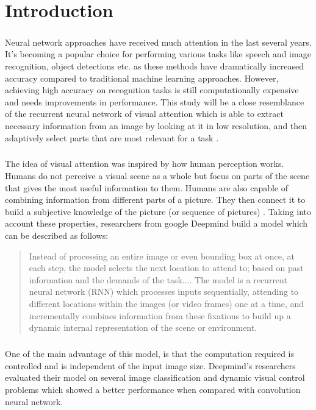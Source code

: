 \chapter{Introduction}
\paragraph{} Neural network approaches have received much attention in the last several years.
It's becoming a popular choice for performing various tasks like speech and image recognition,
object detections etc. as these methods have dramatically increased accuracy
compared to traditional machine learning approaches.
However, achieving high accuracy on recognition tasks is still computationally
expensive and needs improvements in performance.
This study will be a close resemblance of the recurrent neural network of visual attention which is able to extract necessary
information from an image by looking at it in low resolution, and then
adaptively select parts that are most relevant for a task \cite{Mnih2014}.

 \paragraph{} The idea of visual attention was inspired by how human perception works.
 Humans do not perceive a visual scene as a whole but focus on parts of
 the scene that gives the most useful information to them.
 Humans are also capable of combining information from different parts of a picture.
 They then connect it to build a subjective knowledge of the picture (or sequence of pictures) \cite{Goldsborough}.
Taking into account these properties, researchers from google
Deepmind build a model which can be described as follows:
 \blockquote{
 	Instead of processing an entire image or even bounding box at once,
 	at each step, the model selects the next location to attend to;
	based on past information and the demands of the task....
	The model is a recurrent neural network (RNN) which processes
	inputs sequentially, attending to different locations within the
	images (or video frames) one at a time, and incrementally combines
	information from these fixations to build up a dynamic internal
	representation of the scene or environment.\cite{Mnih2014}
}

 \paragraph{} One of the main advantage of this model, is that the computation required is
 controlled and is independent of the input image size.
 Deepmind’s researchers evaluated their model on several image classification
 and dynamic visual control problems which showed a better performance when
 compared with convolution neural network\cite{Goldsborough}.


